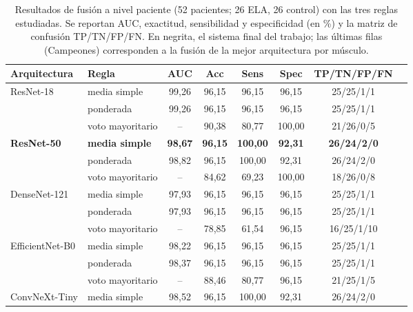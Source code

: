 \documentclass[12pt]{extarticle}
\numberwithin{equation}{section}
\begin{document}
\begin{refsection}
\begin{table}[h!]
\centering
\caption{Resultados de fusión a nivel paciente (52 pacientes; 26 ELA, 26 control) con las tres reglas estudiadas. Se reportan AUC, exactitud, sensibilidad y especificidad (en \%) y la matriz de confusión TP/TN/FP/FN. En negrita, el sistema final del trabajo; las últimas filas (Campeones) corresponden a la fusión de la mejor arquitectura por músculo.}
\label{tab:fusion}
\footnotesize
\begin{tabular}{llcccccc}
\toprule
\textbf{Arquitectura} & \textbf{Regla} & \textbf{AUC} & \textbf{Acc} & \textbf{Sens} & \textbf{Spec} & \textbf{TP/TN/FP/FN} \\
\midrule
\multirow{3}{*}{ResNet-18} & media simple     & 99{,}26 & 96{,}15 & 96{,}15 & 96{,}15 & 25/25/1/1 \\
                                & ponderada        & 99{,}26 & 96{,}15 & 96{,}15 & 96{,}15 & 25/25/1/1 \\
                                & voto mayoritario & -- & 90{,}38 & 80{,}77 & 100{,}00 & 21/26/0/5 \\
\midrule
\multirow{3}{*}{\textbf{ResNet-50}} & \textbf{media simple} & \textbf{98{,}67} & \textbf{96{,}15} & \textbf{100{,}00} & \textbf{92{,}31} & \textbf{26/24/2/0} \\
                                & ponderada        & 98{,}82 & 96{,}15 & 100{,}00 & 92{,}31 & 26/24/2/0 \\
                                & voto mayoritario & -- & 84{,}62 & 69{,}23 & 100{,}00 & 18/26/0/8 \\
\midrule
\multirow{3}{*}{DenseNet-121} & media simple     & 97{,}93 & 96{,}15 & 96{,}15 & 96{,}15 & 25/25/1/1 \\
                                & ponderada        & 97{,}93 & 96{,}15 & 96{,}15 & 96{,}15 & 25/25/1/1 \\
                                & voto mayoritario & -- & 78{,}85 & 61{,}54 & 96{,}15 & 16/25/1/10 \\
\midrule
\multirow{3}{*}{EfficientNet-B0} & media simple     & 98{,}22 & 96{,}15 & 96{,}15 & 96{,}15 & 25/25/1/1 \\
                                & ponderada        & 98{,}37 & 96{,}15 & 96{,}15 & 96{,}15 & 25/25/1/1 \\
                                & voto mayoritario & -- & 88{,}46 & 80{,}77 & 96{,}15 & 21/25/1/5 \\
\midrule
\multirow{3}{*}{ConvNeXt-Tiny} & media simple     & 98{,}52 & 96{,}15 & 100{,}00 & 92{,}31 & 26/24/2/0 \\

\end{tabular}
\end{table}
\end{refsection}
\end{document}
